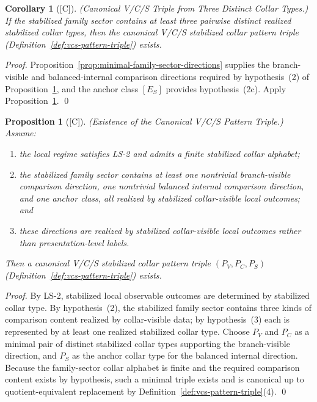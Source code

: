 \documentclass[12pt,oneside]{amsbook}
\theoremstyle{plain}
\newtheorem{proposition}[theorem]{Proposition}
\newtheorem{corollary}[theorem]{Corollary}
\theoremstyle{definition}
\theoremstyle{remark}
\newcommand{\status}[1]{\textup{[#1]}}
\begin{document}
\begin{corollary}[\status{C}]\label{cor:vcs-triple-from-three-types}
\textup{(Canonical V/C/S Triple from Three Distinct Collar Types.)}
If the stabilized family sector contains at least three pairwise
distinct realized stabilized collar types, then the canonical V/C/S
stabilized collar pattern triple
(Definition~\ref{def:vcs-pattern-triple}) exists.
\end{corollary}

\begin{proof}
Proposition~\ref{prop:minimal-family-sector-directions} supplies the
branch-visible and balanced-internal comparison directions required by
hypothesis~(2) of Proposition~\ref{prop:vcs-pattern-exists}, and the
anchor class $[E_S]$ provides hypothesis~(2c).  Apply
Proposition~\ref{prop:vcs-pattern-exists}. \qed
\end{proof}

\begin{proposition}[\status{C}]\label{prop:vcs-pattern-exists}
\textup{(Existence of the Canonical V/C/S Pattern Triple.)}
Assume:
\begin{enumerate}[label=\textup{(\arabic*)}]
  \item the local regime satisfies LS-2 and admits a finite
    stabilized collar alphabet;
  \item the stabilized family sector contains at least one nontrivial
    branch-visible comparison direction, one nontrivial balanced
    internal comparison direction, and one anchor class, all realized
    by stabilized collar-visible local outcomes; and
  \item these directions are realized by stabilized collar-visible
    local outcomes rather than presentation-level labels.
\end{enumerate}
Then a canonical V/C/S stabilized collar pattern triple
$(P_V, P_C, P_S)$ (Definition~\ref{def:vcs-pattern-triple}) exists.
\end{proposition}

\begin{proof}
By LS-2, stabilized local observable outcomes are determined by
stabilized collar type.  By hypothesis~(2), the stabilized family
sector contains three kinds of comparison content realized by
collar-visible data; by hypothesis~(3) each is represented by at
least one realized stabilized collar type.  Choose $P_V$ and $P_C$
as a minimal pair of distinct stabilized collar types supporting the
branch-visible direction, and $P_S$ as the anchor collar type for the
balanced internal direction.  Because the family-sector collar
alphabet is finite and the required comparison content exists by
hypothesis, such a minimal triple exists and is canonical up to
quotient-equivalent replacement by
Definition~\ref{def:vcs-pattern-triple}(4). \qed
\end{proof}
\end{document}
